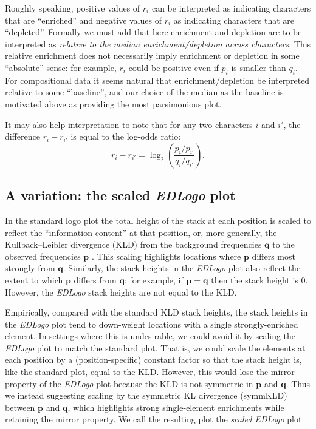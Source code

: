 \documentclass{bmcart}
\def\p{{\mathbf p}}
\def\q{{\mathbf q}}
\begin{document}
Roughly speaking, positive values of $r_i$ can be interpreted as indicating characters that are ``enriched'' and negative values of $r_i$ as indicating characters that are ``depleted''. Formally we must add that here enrichment and depletion are to be interpreted as {\it relative to the median enrichment/depletion across characters}. This relative enrichment does not necessarily imply enrichment or depletion in some ``absolute'' sense: for example, 
$r_i$ could be positive even if $p_i$ is smaller than $q_i$.
For compositional data it seems  natural that enrichment/depletion 
be interpreted relative to some ``baseline'', and our choice of the median as the baseline is motivated above as providing the
most parsimonious plot. 

It may also help interpretation to note that for any two characters $i$ and $i'$, the difference $r_{i}-r_{i'}$
is equal to the log-odds ratio:
\begin{equation}
r_i-r_{i'} = \log_2 \left( \frac{p_{i}/p_{i'}}{q_{i}/q_{i'}} \right).
\end{equation}


\subsection*{A variation: the scaled \textit{EDLogo} plot}

In the standard logo plot the total height of the stack at each position is scaled to reflect the ``information content'' at that position, or, more generally, the Kullback--Leibler
divergence (KLD) from the background frequencies $\q$ to the observed frequencies $\p$ \cite{Stormo2000}. This scaling
highlights locations where $\p$ differs most strongly from $\q$. 
Similarly, the stack heights in the \textit{EDLogo} plot also reflect the extent to which $\p$ differs from $\q$; for example, if $\p=\q$ then the stack height is 0. However, the \textit{EDLogo} stack heights are not equal to the KLD. 

Empirically, compared with the standard KLD stack heights, the stack heights in the \textit{EDLogo} plot tend to down-weight locations with a single strongly-enriched element. 
In settings where this is undesirable, we could
avoid it by
scaling the \textit{EDLogo} plot to match the standard plot. That is,
we could scale
the elements at each position by a (position-specific) constant factor so that
the stack height is, like the standard plot, equal to the KLD. 
However, this would lose the mirror property of the \textit{EDLogo} plot because the KLD is not symmetric in $\p$ and $\q$. Thus
we instead suggesting scaling by the symmetric KL divergence (symmKLD) between $\p$ and $\q$, which highlights strong single-element enrichments while retaining the mirror property. We call the resulting plot the \textit{scaled EDLogo} plot.
\end{document}
